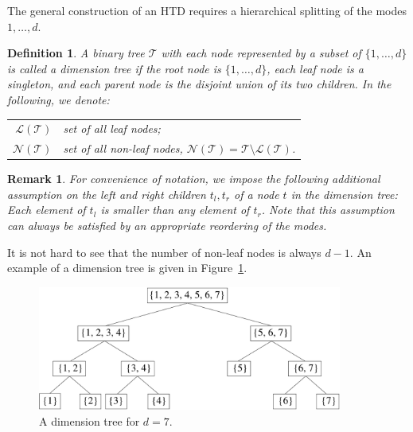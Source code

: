 \documentclass[11pt, a4paper]{article}
\newcommand{\calL}{\mathcal{L}}
\newcommand{\calN}{\mathcal{N}}
\newcommand{\calT}{\mathcal{T}}
\newtheorem{definition}[theorem]{\bf Definition}
\newtheorem{remark}[theorem]{\bf Remark}
\begin{document}
The general construction of an HTD requires a hierarchical splitting of the modes $1,\ldots,d$.
\begin{definition}
 A binary tree $\calT$ with each node represented by a subset of $\{1,\ldots,d\}$ is called a \emph{dimension tree} if 
 the root node is $\{1,\ldots,d\}$, each leaf node is a singleton, and each parent node is the disjoint union of its two children. 
In the following, we denote:
\begin{center}
\begin{tabular}{rl}
$\calL(\calT)$ & set of all leaf nodes; \\
$\calN(\calT)$ & set of all non-leaf nodes, $\calN(\calT) = \calT \setminus \calL(\calT)$. 
\end{tabular}
\end{center}
\end{definition}
\begin{remark}
 For convenience of notation, we impose the following additional
 assumption on the left and right children $t_l,t_r$ of a node $t$ in
 the dimension tree: Each element of $t_l$ is smaller than any element
 of $t_r$. Note that this assumption can always be satisfied by an
 appropriate reordering of the modes.
\end{remark}
It is not hard to see that the number of non-leaf nodes is always
$d-1$.  An example of a dimension tree is given in
Figure~\ref{fig:dimtree}.
\begin{figure}
\begin{center}
  \includegraphics[width=10cm]{dimtree_7.pdf}
\end{center}
\caption{A dimension tree for $d = 7$.} \label{fig:dimtree}
\end{figure}
\end{document}
